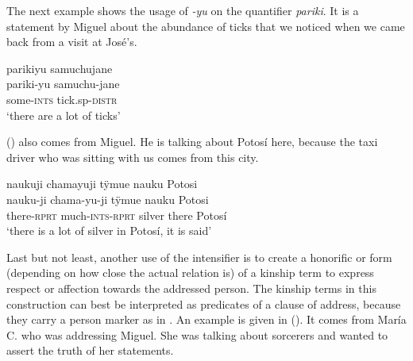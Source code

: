 The next example shows the usage of \textit{-yu} on the quantifier \textit{pariki}. It is a statement by Miguel about the abundance of ticks that we noticed when we came back from a visit at José’s.

\ea\label{ex:parikiyu}
\begingl
\glpreamble parikiyu samuchujane\\
\gla pariki-yu samuchu-jane\\
\glb some-\textsc{ints} tick.sp-\textsc{distr}\\
\glft ‘there are a lot of ticks’
\endgl
\trailingcitation{[mrx-c120509l.148]}
\xe

() also comes from Miguel. He is talking about Potosí here, because the taxi driver who was sitting with us comes from this city.

\ea\label{ex:silver-Potosi-2}
\begingl
\glpreamble naukuji chamayuji tÿmue nauku Potosi\\
\gla nauku-ji chama-yu-ji tÿmue nauku Potosi\\
\glb there-\textsc{rprt} much-\textsc{ints}-\textsc{rprt} silver there Potosí\\
\glft ‘there is a lot of silver in Potosí, it is said’
\endgl
\trailingcitation{[mty-p110906l.229]}
\xe
{}



Last but not least, another use of the intensifier is to create a honorific or  form (depending on how close the actual relation is) of a kinship term to express respect or affection towards the addressed person. The kinship terms in this construction can best be interpreted as predicates of a clause of address, because they carry a person marker as in . An example is given in (). It comes from María C. who was addressing Miguel. She was talking about sorcerers and wanted to assert the truth of her statements.

